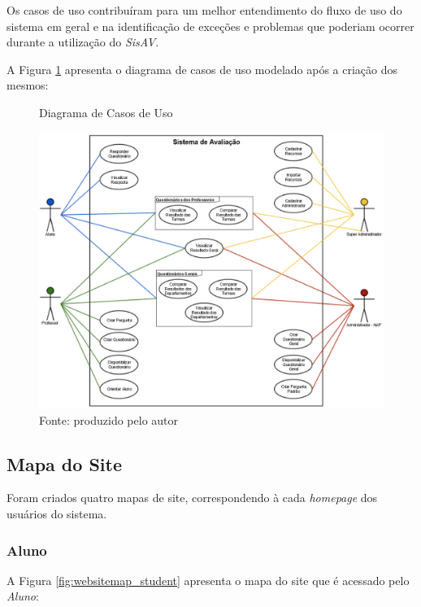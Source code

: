 \documentclass[
  12pt,       %
  openright,      %
  oneside,      %
  a4paper,      %
  english,      %
  french,        %
  spanish,     %
  brazil        %
  ]{abntex2-decsi}
\begin{document}
    Os casos de uso contribuíram para um melhor entendimento do fluxo de uso do sistema em geral e na identificação de exceções e problemas que poderiam ocorrer durante a utilização do \textit{SisAV}. 
    
    A Figura \ref{fig:usecases_diagram} apresenta o diagrama de casos de uso modelado após a criação dos mesmos:
    
    \begin{figure}[h]	
        \centering
        \caption{Diagrama de Casos de Uso}						   			\label{fig:usecases_diagram}
        \includegraphics[scale=0.7]{img/usecases_diagram}
        \caption*{Fonte: produzido pelo autor}
    \end{figure}
    
	\subsection{Mapa do Site}
    
    Foram criados quatro mapas de site, correspondendo à cada \textit{homepage} dos usuários do sistema.
    
        \newpage
        
        \subsubsection{Aluno}
		
        A Figura \ref{fig:websitemap_student} apresenta o mapa do site que é acessado pelo \textit{Aluno}:
        
\end{document}
